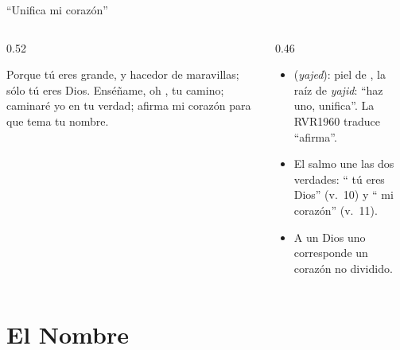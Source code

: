 \begin{frame}{``Unifica mi corazón''}
\begin{columns}[c,onlytextwidth]
\begin{column}{0.52\textwidth}
\begin{center}\end{center}
\begin{cita}Porque tú eres grande, y hacedor de maravillas; sólo tú eres Dios. Enséñame, oh \SENOR, tu camino; caminaré yo en tu verdad; afirma mi corazón para que tema tu nombre.\end{cita}
\end{column}
\begin{column}{0.46\textwidth}\small
\begin{itemize}
\item {} (\emph{yajed}): piel de , la raíz de \emph{yajid}: ``haz uno, unifica''. La RVR1960 traduce ``afirma''.
\item El salmo une las dos verdades: `` tú eres Dios'' (v.~10) y `` mi corazón'' (v.~11).
\item A un Dios uno corresponde un corazón no dividido.
\end{itemize}
\end{column}
\end{columns}
\end{frame}

\section{El Nombre}

